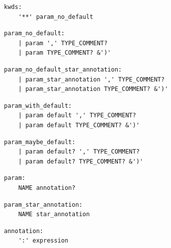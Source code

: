 \noindent\textbf{\texttt{}}\par
\begin{lstlisting}
kwds:
    '**' param_no_default
\end{lstlisting}

\noindent\textbf{\texttt{}}\par
\begin{lstlisting}
param_no_default:
    | param ',' TYPE_COMMENT?
    | param TYPE_COMMENT? &')'
\end{lstlisting}

\noindent\textbf{\texttt{}}\par
\begin{lstlisting}
param_no_default_star_annotation:
    | param_star_annotation ',' TYPE_COMMENT?
    | param_star_annotation TYPE_COMMENT? &')'
\end{lstlisting}

\noindent\textbf{\texttt{}}\par
\begin{lstlisting}
param_with_default:
    | param default ',' TYPE_COMMENT?
    | param default TYPE_COMMENT? &')'
\end{lstlisting}

\noindent\textbf{\texttt{}}\par
\begin{lstlisting}
param_maybe_default:
    | param default? ',' TYPE_COMMENT?
    | param default? TYPE_COMMENT? &')'
\end{lstlisting}

\noindent\textbf{\texttt{}}\par
\begin{lstlisting}
param:
    NAME annotation?
\end{lstlisting}

\noindent\textbf{\texttt{}}\par
\begin{lstlisting}
param_star_annotation:
    NAME star_annotation
\end{lstlisting}

\noindent\textbf{\texttt{}}\par
\begin{lstlisting}
annotation:
    ':' expression
\end{lstlisting}

